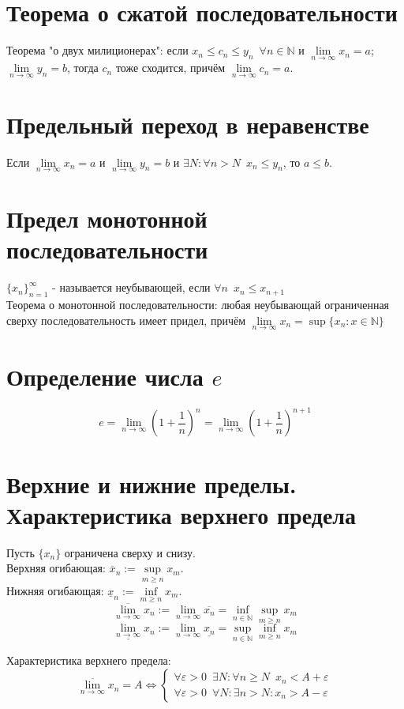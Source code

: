 \documentclass[11pt, a4paper]{article}
\def\N{\mathbb{N}}
\def\sp{\, \, \,}
\def\linf{\lim \limits_{n \to \infty}}
\begin{document}
    \section{Теорема о сжатой последовательности}
    Теорема "о двух милиционерах": если $x_n \leq c_n \leq y_n \sp \forall n \in \N$ и $\linf x_n = a$; $\linf y_n = b$, тогда $c_n$ тоже сходится, причём $\linf c_n = a$.

    \section{Предельный переход в неравенстве}
    Если $\linf x_n = a$ и $\linf y_n = b$ и $\exists N: \forall n > N \sp x_n \leq y_n$, то $a \leq b$.
    
    \section{Предел монотонной последовательности}
    $\{x_n\}_{n=1}^{\infty}$ - называется неубывающей, если $\forall n \sp x_n \leq x_{n+1}$\\
    Теорема о монотонной последовательности: любая неубывающай ограниченная сверху последовательность имеет придел, причём $\linf x_n = \sup \{x_n: x \in \N\}$

    \section{Определение числа $e$}
    \[e = \linf \left(1+\frac{1}{n}\right)^n = \linf \left(1+\frac{1}{n}\right)^{n+1}\]

    \section{Верхние и нижние пределы. Характеристика верхнего предела}
    Пусть $\{x_n\}$ ограничена сверху и снизу.\\
    Верхняя огибающая: $\overline{x}_n := \sup \limits_{m \geq n} x_m$.\\
    Нижняя огибающая: $\underline{x}_n := \inf \limits_{m \geq n} x_m$.\\
    \[\overline{\linf} x_n := \linf \overline{x_n} = \inf \limits_{n \in \N} \sup \limits_{m \geq n} x_m\]
    \[\underline{\linf} x_n := \linf \underline{x_n} = \sup \limits_{n \in \N} \inf \limits_{m \geq n} x_m\]

    Характеристика верхнего предела:
    $$\overline{\linf} x_n = A \Leftrightarrow
    \begin{cases}
        \forall \varepsilon > 0 \sp \exists N: \forall n \geq N \sp x_n < A + \varepsilon \\
        \forall \varepsilon > 0 \sp \forall N: \exists n > N: x_n > A - \varepsilon
    \end{cases}$$
\end{document}
